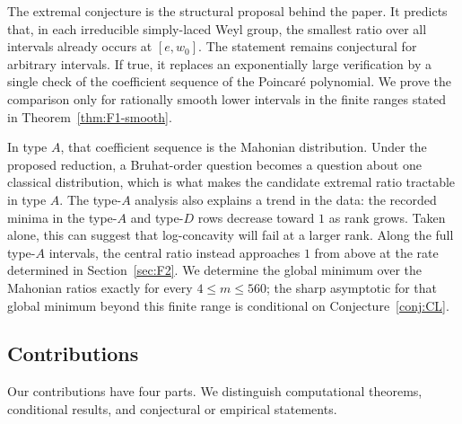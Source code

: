 \documentclass[11pt]{amsart}
\theoremstyle{plain}
\theoremstyle{definition}
\theoremstyle{remark}
\begin{document}
The extremal conjecture is the structural proposal behind the paper. It
predicts that, in each irreducible simply-laced Weyl group, the smallest
ratio over all intervals already occurs at $[e,w_0]$. The statement remains
conjectural for arbitrary intervals. If true, it replaces an exponentially
large verification by a single check of the coefficient sequence of the
Poincar\'e polynomial. We prove the comparison only for rationally smooth
lower intervals in the finite ranges stated in
Theorem~\ref{thm:F1-smooth}.

In type $A$, that coefficient sequence is the Mahonian distribution. Under
the proposed reduction, a Bruhat-order question becomes a question about
one classical distribution, which is what makes the candidate extremal
ratio tractable in type $A$. The type-$A$ analysis also explains a trend in
the data: the recorded minima in the type-$A$ and type-$D$ rows decrease
toward $1$ as rank grows. Taken alone, this can suggest that log-concavity
will fail at a larger rank. Along the full type-$A$ intervals, the central
ratio instead approaches $1$ from above at the rate determined in
Section~\ref{sec:F2}. We determine the global minimum over the Mahonian
ratios exactly for every $4\le m\le560$; the sharp asymptotic for that
global minimum beyond this finite range is conditional on
Conjecture~\ref{conj:CL}.

\subsection*{Contributions} Our contributions have four parts. We
distinguish computational theorems, conditional results, and conjectural or
empirical statements.
\end{document}
